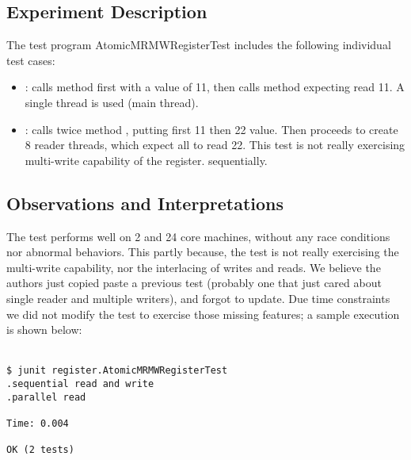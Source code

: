 \subsection{Experiment Description}
The test program AtomicMRMWRegisterTest includes the following individual
test cases: 

\begin{itemize}
  \item {}: calls  method first with a value
    of 11, then calls  method expecting read 11. A single
    thread is used (main thread).
  \item {}: calls twice method , putting first
    11 then 22 value. Then proceeds to create 8 reader threads, which
    expect all to read 22. This test is not really exercising
    multi-write capability of the register.
    sequentially.
\end{itemize}

\subsection{Observations and Interpretations}
The test performs well on 2 and 24 core machines, without any race
conditions nor abnormal behaviors. This partly because, the test is
not really exercising the multi-write capability, nor the interlacing
of writes and reads. We believe the authors just copied paste a
previous test (probably one that just cared about single reader and
multiple writers), and forgot to update. Due time constraints we did
not modify the test to exercise those missing features; a sample
execution is shown below: \\\\

\begin{verbatim}
$ junit register.AtomicMRMWRegisterTest
.sequential read and write
.parallel read

Time: 0.004

OK (2 tests)
\end{verbatim}
\hfill
